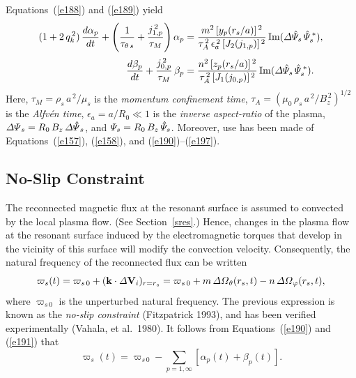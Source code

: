 \documentclass[notitlepage,12pt]{article}
\begin{document}
Equations~(\ref{e188}) and (\ref{e189}) yield
\begin{align}\label{e198}
(1+2\,q_k^{\,2})\,\frac{d\alpha_p}{dt} + \left(\frac{1}{\tau_{\theta\,s}}+\frac{j_{1,p}^{\,2}}{\tau_{M}}\right)\alpha_p
&= \frac{m^{2}\,[y_p(r_s/a)]^{\,2}}{\tau_A^{\,2}\,\epsilon_a^{\,2}\,[J_2(j_{1,p})]^{\,2}}\,
{\rm Im}({\mit\Delta\hat{\Psi}_s}\,\hat{\mit\Psi}_s^{\,\ast}),\\[0.5ex]
\frac{d\beta_p}{dt} + \frac{j_{0,p}^{\,2}}{\tau_{M}}\,\beta_p
&= \frac{n^{2}\,[z_p(r_s/a)]^{\,2}}{\tau_A^{\,2}\,[J_1(j_{0,p})]^{\,2}}\,
{\rm Im}({\mit\Delta\hat{\Psi}_s}\,\hat{\mit\Psi}_s^{\,\ast}).\label{e199}
\end{align}
Here, $\tau_{M} =\rho_s\,a^{\,2}/\mu_s$ is the {\em momentum confinement time}, $\tau_A = (\mu_0\,\rho_s\,a^{\,2}/B_z^{\,2})^{1/2}$ is the {\em Alfv\'{e}n time}, $\epsilon_a=a/R_0\ll 1$ is the {\em inverse aspect-ratio}\/ of the plasma,
${\mit\Delta\Psi}_s = R_0\,B_z\,{\mit\Delta\hat{\Psi}}_s$, and ${\mit\Psi}_s = R_0\,B_z\,\hat{\mit\Psi}_s$. Moreover,
use has been made of Equations~(\ref{e157}), (\ref{e158}), and (\ref{e190})--(\ref{e197}). 

\subsection{No-Slip Constraint}
The reconnected magnetic flux at the resonant surface is assumed to convected by the local plasma flow. (See Section~\ref{sres}.) Hence, changes in the
plasma flow at the resonant surface induced by the electromagnetic torques that develop in the vicinity of this
surface will modify the convection velocity. Consequently, the natural frequency of the reconnected flux can be written
\begin{equation}
 \varpi_s(t) = \varpi_{s\,0} + ({\bf k}\cdot {\mit\Delta}{\bf V}_i)_{r=r_s}=
 \varpi_{s\,0} + m\,{\mit\Delta\Omega}_\theta(r_s,t) - n\,{\mit\Delta\Omega}_\varphi(r_s,t),
\end{equation}
where $\varpi_{s\,0}$ is the unperturbed natural frequency. The previous expression is known as the {\em no-slip constraint}\/ (Fitzpatrick 1993), and has been verified experimentally (Vahala, et al.\ 1980). 
It follows from Equations~(\ref{e190})
and (\ref{e191}) that
\begin{equation}\label{e201}
\varpi_s(t) = \varpi_{s\,0} - \sum_{p=1,\infty}\left[\alpha_p(t)+\beta_p(t)\right].
\end{equation}
\end{document}
